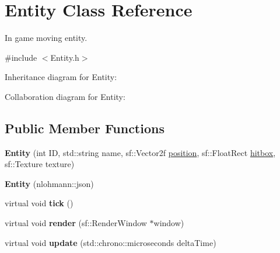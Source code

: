 \hypertarget{classEntity}{\section{Entity Class Reference}
\label{classEntity}
}


In game moving entity.  




{\ttfamily \#include $<$Entity.\-h$>$}



Inheritance diagram for Entity\-:


Collaboration diagram for Entity\-:
\subsection*{Public Member Functions}
\begin{DoxyCompactItemize}
\item 
\hypertarget{classEntity_abe533e6ed661368ddfb2abc4f355e5ae}{{\bfseries Entity} (int I\-D, std\-::string name, sf\-::\-Vector2f \hyperlink{classEntity_afc349ec89c2bffef70bf6a1d95603154}{position}, sf\-::\-Float\-Rect \hyperlink{classEntity_a3bed8137e87ee1923135c5b24207da60}{hitbox}, sf\-::\-Texture texture)}\label{classEntity_abe533e6ed661368ddfb2abc4f355e5ae}

\item 
\hypertarget{classEntity_a45c6ac38444033089ec95e3e7c26c0c8}{{\bfseries Entity} (nlohmann\-::json)}\label{classEntity_a45c6ac38444033089ec95e3e7c26c0c8}

\item 
\hypertarget{classEntity_a2f08fe2d5e636d5d3bd17652c2e4eb53}{virtual void {\bfseries tick} ()}\label{classEntity_a2f08fe2d5e636d5d3bd17652c2e4eb53}

\item 
\hypertarget{classEntity_ad87af2e77fbcda048f7543bfb43ddaaf}{virtual void {\bfseries render} (sf\-::\-Render\-Window $\ast$window)}\label{classEntity_ad87af2e77fbcda048f7543bfb43ddaaf}

\item 
\hypertarget{classEntity_a06f9fd4c95bcf72cd3ffef5b18218f76}{virtual void {\bfseries update} (std\-::chrono\-::microseconds delta\-Time)}\label{classEntity_a06f9fd4c95bcf72cd3ffef5b18218f76}

\end{DoxyCompactItemize}
